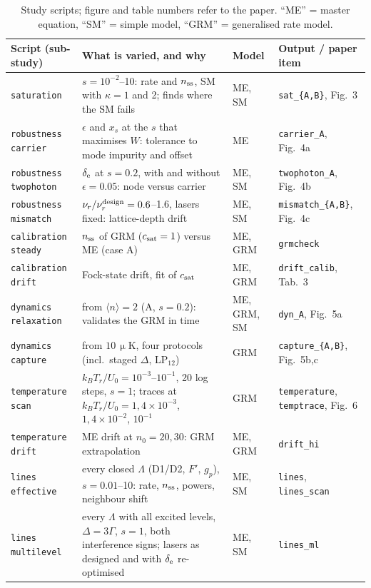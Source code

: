 \documentclass[11pt,a4paper]{article}
\newcommand{\code}[1]{\texttt{#1}}
\newcommand{\SI}[2]{\ensuremath{#1\,\mathrm{#2}}}
\begin{document}
\begin{table}[h]
\centering\small
\caption{Study scripts; figure and table numbers refer to the paper. ``ME'' = master equation, ``SM'' = simple model, ``GRM'' = generalised rate model.}
\label{tab:studies}
\begin{tabularx}{\textwidth}{@{}lXll@{}}
\toprule
Script (sub-study) & What is varied, and why & Model & Output / paper item\\
\midrule
\code{saturation} & $s=10^{-2}$--10: rate and $n_{\rm ss}$, SM with $\kappa=1$ and 2; finds where the SM fails & ME, SM & \code{sat\_\{A,B\}}, Fig.~3\\
\code{robustness carrier} & $\epsilon$ and $x_s$ at the $s$ that maximises $W$: tolerance to mode impurity and offset & ME & \code{carrier\_A}, Fig.~4a\\
\code{robustness twophoton} & $\delta_{\rm e}$ at $s=0.2$, with and without $\epsilon=0.05$: node versus carrier & ME, SM & \code{twophoton\_A}, Fig.~4b\\
\code{robustness mismatch} & $\nu_r/\nu_r^{\rm design}=0.6$--1.6, lasers fixed: lattice-depth drift & ME, SM & \code{mismatch\_\{A,B\}}, Fig.~4c\\
\code{calibration steady} & $n_{\rm ss}$ of GRM ($c_{\rm sat}=1$) versus ME (case A) & ME, GRM & \code{grmcheck}\\
\code{calibration drift} & Fock-state drift, fit of $c_{\rm sat}$ & ME, GRM & \code{drift\_calib}, Tab.~3\\
\code{dynamics relaxation} & from $\langle n\rangle=2$ (A, $s=0.2$): validates the GRM in time & ME, GRM, SM & \code{dyn\_A}, Fig.~5a\\
\code{dynamics capture} & from \SI{10}{\upmu K}, four protocols (incl.\ staged $\Delta$, LP$_{12}$) & GRM & \code{capture\_\{A,B\}}, Fig.~5b,c\\
\code{temperature scan} & $k_BT_r/U_0=10^{-3}$--$10^{-1}$, 20 log steps, $s=1$; traces at $k_BT_r/U_0=1,4\times10^{-3}$, $1,4\times10^{-2}$, $10^{-1}$ & GRM & \code{temperature}, \code{temptrace}, Fig.~6\\
\code{temperature drift} & ME drift at $n_0=20,30$: GRM extrapolation & ME, GRM & \code{drift\_hi}\\
\code{lines effective} & every closed $\Lambda$ (D1/D2, $F'$, $g_p$), $s=0.01$--10: rate, $n_{\rm ss}$, powers, neighbour shift & ME, SM & \code{lines}, \code{lines\_scan}\\
\code{lines multilevel} & every $\Lambda$ with all excited levels, $\Delta=3\Gamma$, $s=1$, both interference signs; lasers as designed and with $\delta_{\rm e}$ re-optimised & ME, SM & \code{lines\_ml}\\

\end{tabularx}
\end{table}
\end{document}
